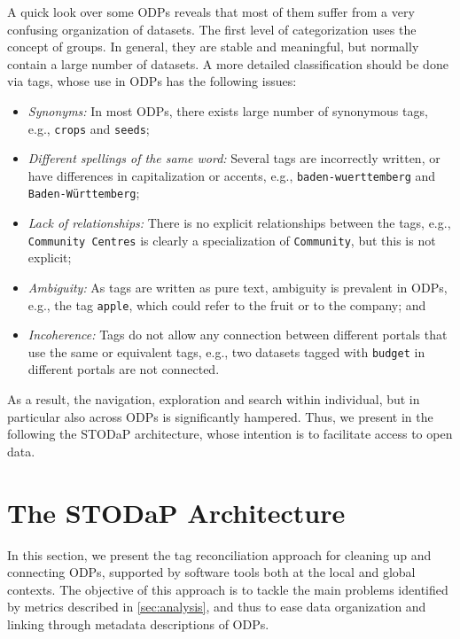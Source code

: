 A quick look over some ODPs reveals that most of them suffer from a very confusing organization of datasets. 
The first level of categorization uses the concept of groups.
In general, they are stable and meaningful, but normally contain a large number of datasets.
A more detailed classification should be done via tags, whose use in ODPs has the following issues:

\begin{itemize}
	\item \emph{Synonyms:} In most ODPs, there exists large number of synonymous tags, e.g., \texttt{crops} and \texttt{seeds};
	\item \emph{Different spellings of the same word:} Several tags are incorrectly written, or have differences in capitalization or accents, e.g., \texttt{baden-wuerttemberg} and \texttt{Baden-W\"{u}rttemberg};
	\item \emph{Lack of relationships:} There is no explicit relationships between the tags, e.g., \texttt{Community Centres} is clearly a specialization of \texttt{Community}, but this is not explicit;
	\item \emph{Ambiguity:} As tags are written as pure text, ambiguity is prevalent in ODPs, e.g., the tag \texttt{apple}, which could refer to the fruit or to the company; and
	\item \emph{Incoherence:} Tags do not allow any connection between different portals that use the same or equivalent tags, e.g., two datasets tagged with \texttt{budget} in different portals are not connected.
\end{itemize}

As a result, the navigation, exploration and search within individual, but in particular also across ODPs is significantly hampered.
Thus, we present in the following the STODaP architecture, whose intention is to facilitate access to open data.


\section{The STODaP Architecture}
\label{sec:stodap_architecture}

In this section, we present the tag reconciliation approach for cleaning up and connecting ODPs, supported by software tools both at the local and global contexts.
The objective of this approach is to tackle the main problems identified by metrics described in \autoref{sec:analysis}, and thus to ease data organization and linking through metadata descriptions of ODPs.


